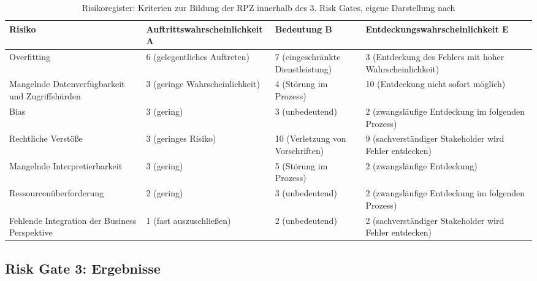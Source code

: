 \begin{table}[H]
\centering
\renewcommand{\arraystretch}{1.3}
\begin{tabular}{|p{3cm}|p{4.9cm}|p{3cm}|p{4.9cm}|}
\hline
\textbf{Risiko} & \textbf{Auftritts\-wahrscheinlichkeit A} & \textbf{Bedeutung B} & \textbf{Entdeckungs\-wahrscheinlichkeit E} \\
\hline

Overfitting 
& 6 (gelegentliches Auftreten)
& 7 (eingeschränkte Dienstleistung)
& 3 (Entdeckung des Fehlers mit hoher Wahrscheinlichkeit) \\
\hline

Mangelnde Datenverfügbarkeit und Zugriffshürden
& 3 (geringe Wahrscheinlichkeit)
& 4 (Störung im Prozess)
& 10 (Entdeckung nicht sofort möglich) \\
\hline

Bias
& 3 (gering)
& 3 (unbedeutend)
& 2 (zwangsläufige Entdeckung im folgenden Prozess) \\
\hline

Rechtliche Verstöße
& 3 (geringes Risiko)
& 10 (Verletzung von Vorschriften)
& 9 (sachverständiger Stakeholder wird Fehler entdecken) \\
\hline

Mangelnde Interpretierbarkeit
& 3 (gering)
& 5 (Störung im Prozess)
& 2 (zwangsläufige Entdeckung) \\
\hline

Res\-sour\-cen\-über\-for\-de\-rung
& 2 (gering)
& 3 (unbedeutend)
& 2 (zwangsläufige Entdeckung im folgenden Prozess) \\
\hline

Fehlende Integration der Business Perspektive
& 1 (fast auszuschließen)
& 2 (unbedeutend)
& 2 (sachverständiger Stakeholder wird Fehler entdecken) \\
\hline

\end{tabular}
\caption{Risikoregister: Kriterien zur Bildung der RPZ innerhalb des 3. Risk Gates, eigene Darstellung nach \cite{Bundesministerium_2018}}
\label{tab:cs2_app_rg3_kriterien_rpz}
\end{table}

\subsection{Risk Gate 3: Ergebnisse}


